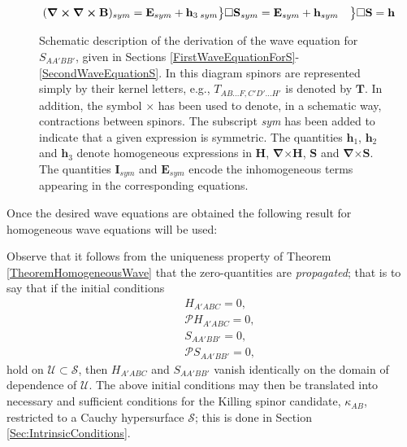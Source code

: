 \documentclass[10pt,a4paper]{article}
\theoremstyle{plain}
\newenvironment{rcases}
  {\left.\begin{aligned}}
  {\end{aligned}\right\rbrace}
\begin{document}
\begin{figure}[h!]
\begin{equation*}
\begin{rcases}
\begin{rcases}
  (\bm\nabla\bm\times\bm\nabla \bm\times \mathbf{B})_{sym}=
  \mathbf{E}_{sym} + \mathbf{h}_{3\;sym}
\end{rcases}
&\square \mathbf{S}_{sym} =\mathbf{E}_{sym}+ \mathbf{h}_{sym}
\end{rcases}
\square\mathbf{S}=\mathbf{h}
\end{equation*}
\caption{ Schematic description of the derivation of the wave
  equation for $S_{AA'BB'}$, given in Sections
  \ref{FirstWaveEquationForS}-\ref{SecondWaveEquationS}.  In this
  diagram spinors are represented simply by their kernel letters, e.g., 
  $T_{AB...F,C'D'...H'}$ is denoted by $\mathbf{T}$.
 In addition, the symbol $\bm\times$ has been used
  to denote, in a schematic way, contractions between
  spinors.  The subscript \emph{sym} has been added to indicate that a
  given expression is symmetric. The quantities $\mathbf{h}_{1}$,
  $\mathbf{h}_{2}$ and $\mathbf{h}_{3}$ denote  homogeneous
  expressions in $\mathbf{H}$, $\bm\nabla
  \bm\times\mathbf{H}$, $\mathbf{S}$ and $\bm\nabla \bm\times
  \mathbf{S}$. The quantities $\mathbf{I}_{sym}$ and
  $\mathbf{E}_{sym}$ encode the inhomogeneous terms appearing in the
  corresponding equations.}
\label{fig:Schematic}
\end{figure}


Once the desired wave equations are obtained the following
result for homogeneous wave equations will be used:

\medskip

Observe that  it follows from the
uniqueness property of Theorem \ref{TheoremHomogeneousWave} that the
zero-quantities are \emph{propagated}; that is to say that if the
initial conditions
\begin{eqnarray*}
&& H_{A'ABC}=0,\\ && \mathcal{P} H_{A'ABC}=0,\\ &&
  S_{AA'BB'}=0,\\ &&\mathcal{P} S_{AA'BB'}=0,
\end{eqnarray*} 
hold on $\mathcal{U}\subset\mathcal{S}$, then $H_{A'ABC}$ and
$S_{AA'BB'}$ vanish identically on the domain of dependence of
$\mathcal{U}$. The above initial conditions may then be translated
into necessary and sufficient conditions for the Killing spinor
candidate, $\kappa_{AB}$, restricted to a Cauchy hypersurface
$\mathcal{S}$; this is done in Section
\ref{Sec:IntrinsicConditions}.
\end{document}
